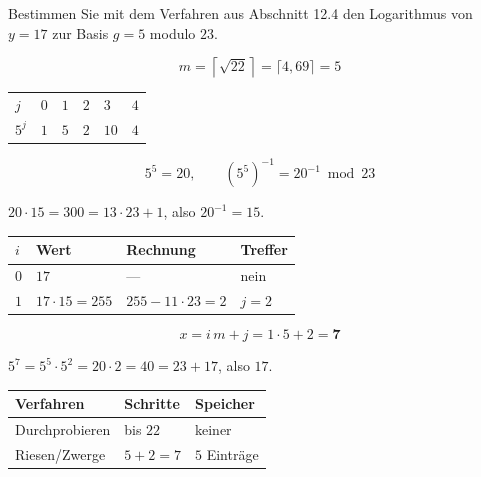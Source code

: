 \begin{aufgabe}
Bestimmen Sie mit dem Verfahren aus Abschnitt 12.4 den Logarithmus von $y = 17$ zur Basis $g=5$ modulo $23$.

\loesung
{}
\[ m = \left\lceil\sqrt{22}\right\rceil = \lceil 4{,}69\rceil = 5 \]

\begin{center}
\renewcommand{\arraystretch}{1.46}
\begin{tabular}{@{}P{1.2cm}P{1.2cm}P{1.2cm}P{1.2cm}P{1.2cm}P{1.2cm}@{}}
\toprule
$j$ & $0$ & $1$ & $2$ & $3$ & $4$\\
$5^j$ & $1$ & $5$ & $2$ & $10$ & $4$\\
\bottomrule
\end{tabular}
\end{center}

\[ 5^{5} = 20, \qquad (5^{5})^{-1} = 20^{-1} \bmod 23 \]

 $20\cdot15 = 300 = 13\cdot23+1$, also $20^{-1} = 15$.

\begin{center}
{\small
\renewcommand{\arraystretch}{1.48}
\begin{tabular}{@{}P{1.4cm}P{2.8cm}P{2.2cm}P{1.6cm}@{}}
\toprule
$i$ & \textbf{Wert} & \textbf{Rechnung} & \textbf{Treffer}\\
\midrule
$0$ & $17$ & --- & nein\\
$1$ & $17\cdot15 = 255$ & $255-11\cdot23 = 2$ & \textcolor{gruen}{$j=2$}\\
\bottomrule
\end{tabular}}
\end{center}

\[ x = i\,m + j = 1\cdot5 + 2 = \mathbf{7} \]

 $5^{7} = 5^{5}\cdot5^{2} = 20\cdot2 = 40 = 23+17$, also $17$. \checkmark

\begin{center}
\renewcommand{\arraystretch}{1.48}
\begin{tabular}{@{}P{3.0cm}P{2.0cm}P{2.4cm}@{}}
\toprule
\textbf{Verfahren} & \textbf{Schritte} & \textbf{Speicher}\\
\midrule
Durch\-probieren & bis $22$ & keiner\\
Riesen/Zwerge & $5+2 = 7$ & $5$ Einträge\\
\bottomrule
\end{tabular}
\end{center}


\end{aufgabe}
